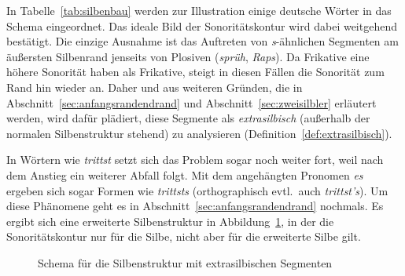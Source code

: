 
In Tabelle~\ref{tab:silbenbau} werden zur Illustration einige deutsche Wörter in das Schema eingeordnet.
Das ideale Bild der Sonoritätskontur wird dabei weitgehend bestätigt.
Die einzige Ausnahme ist das Auftreten von \textit{s}-ähnlichen Segmenten am äußersten Silbenrand jenseits von Plosiven (\textit{sprüh}, \textit{Raps}).
Da Frikative eine höhere Sonorität haben als Frikative, steigt in diesen Fällen die Sonorität zum Rand hin wieder an.
Daher und aus weiteren Gründen, die in Abschnitt~\ref{sec:anfangsrandendrand} und Abschnitt~\ref{sec:zweisilbler} erläutert werden, wird dafür plädiert, diese Segmente als \textit{extrasilbisch} (außerhalb der normalen Silbenstruktur stehend) zu analysieren (Definition~\ref{def:extrasilbisch}).


In Wörtern wie \textit{trittst} setzt sich das Problem sogar noch weiter fort, weil nach dem Anstieg ein weiterer Abfall folgt.
Mit dem angehängten Pronomen \textit{es} ergeben sich sogar Formen wie \textit{trittsts} (orthographisch evtl.\ auch \textit{trittst's}).
Um diese Phänomene geht es in Abschnitt~\ref{sec:anfangsrandendrand} nochmals.
Es ergibt sich eine erweiterte Silbenstruktur in Abbildung~\ref{fig:silbenstrukturextra}, in der die Sonoritätskontur nur für die Silbe, nicht aber für die erweiterte Silbe gilt.

\begin{figure}
  \centering
  \caption{Schema für die Silbenstruktur mit extrasilbischen Segmenten}
  \label{fig:silbenstrukturextra}
\end{figure}

